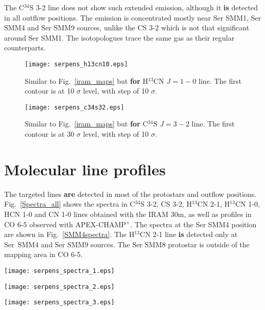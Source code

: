 \documentclass{aa}
\begin{document}
\begin{appendix}
The C$^{34}$S 3-2 line does not show such extended emission, although it \textbf{is} detected in all outflow positions. The emission is concentrated mostly near Ser SMM1, Ser SMM4 and Ser SMM9 sources, unlike the CS 3-2 which is not that significant around Ser SMM1. The isotopologues trace the same gas as their regular counterparts.

\begin{figure} \texttt{[image: serpens\_h13cn10.eps]} \caption{Similar to Fig.~\ref{iram_maps}
but \textbf{for} H$^{13}$CN $J=1-0$ line. The first contour is at 10 $\sigma$ level, with step
of 10 $\sigma$.} \label{h13cn10} \end{figure}


\begin{figure} \texttt{[image: serpens\_c34s32.eps]} \caption{Similar to Fig.~\ref{iram_maps}
but \textbf{for} C$^{34}$S $J=3-2$ line. The first contour is at 30 $\sigma$ level, with step of
10 $\sigma$.} \label{c34s32} \end{figure}

\section{Molecular line profiles}
\label{app:lines}

The targeted lines \textbf{are} detected in most of the protostars and outflow positions. Fig.~\ref{Spectra_all} shows the spectra in C$^{34}$S 3-2, CS 3-2, H$^{13}$CN 2-1, H$^{13}$CN 1-0, HCN 1-0 and CN 1-0 lines obtained with the IRAM 30m, as well as profiles in CO 6-5 observed with APEX-CHAMP$^+$. The spectra at the Ser SMM4 position are shown in Fig.~\ref{SMM4spectra}. The H$^{13}$CN 2-1 line \textbf{is} detected only at Ser~SMM4 and Ser SMM9 sources. The Ser SMM8 protostar is outside of the mapping area in CO 6-5.



\begin{figure*} 
\centering 
\texttt{[image: serpens\_spectra\_1.eps]}
\label{Spectra1} 
\end{figure*} 

\begin{figure*} 
\centering
\texttt{[image: serpens\_spectra\_2.eps]} 
\label{Spectra2} 
\end{figure*}

\begin{figure*}
\centering 
\texttt{[image: serpens\_spectra\_3.eps]}
\label{Spectra3} 
\end{figure*} 


\end{appendix}
\end{document}
